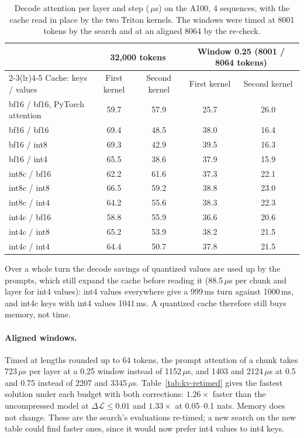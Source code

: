 \documentclass[11pt]{article}
\newcommand{\dloss}{\Delta\mathcal{L}}
\newcommand{\us}{\,$\mu$s}
\begin{document}
\begin{table}[htbp]
\centering
\small
\begin{tabular}{lcccc}
\toprule
& \multicolumn{2}{c}{32{,}000 tokens} & \multicolumn{2}{c}{Window 0.25 (8001 / 8064 tokens)} \\
\cmidrule(lr){2-3}\cmidrule(lr){4-5}
Cache: keys / values & First kernel & Second kernel & First kernel & Second kernel \\
\midrule
bf16 / bf16, PyTorch attention & 59.7 & 57.9 & 25.7 & 26.0 \\
bf16 / bf16                    & 69.4 & 48.5 & 38.0 & 16.4 \\
bf16 / int8                    & 69.3 & 42.9 & 39.5 & 16.3 \\
bf16 / int4                    & 65.5 & 38.6 & 37.9 & 15.9 \\
int8c / bf16                   & 62.2 & 61.6 & 37.3 & 22.1 \\
int8c / int8                   & 66.5 & 59.2 & 38.8 & 23.0 \\
int8c / int4                   & 64.2 & 55.6 & 38.3 & 22.3 \\
int4c / bf16                   & 58.8 & 55.9 & 36.6 & 20.6 \\
int4c / int8                   & 65.2 & 53.9 & 38.2 & 21.5 \\
int4c / int4                   & 64.4 & 50.7 & 37.8 & 21.5 \\
\bottomrule
\end{tabular}
\caption{Decode attention per layer and step (\us) on the A100, 4 sequences, with the cache read in place by
the two Triton kernels. The windows were timed at 8001 tokens by the search and at an aligned 8064 by the
re-check.}
\label{tab:kv-kernel}
\end{table}

\noindent Over a whole turn the decode savings of quantized values are used up by the prompts, which
still expand the cache before reading it (88.5\us{} per chunk and layer for int4 values): int4 values
everywhere give a 999\,ms turn against 1000\,ms, and int4c keys with int4 values 1041\,ms. A quantized
cache therefore still buys memory, not time.

\paragraph{Aligned windows.} Timed at lengths rounded up to 64 tokens, the prompt attention of a chunk
takes 723\us{} per layer at a 0.25 window instead of 1152\us, and 1403 and 2124\us{} at 0.5 and 0.75
instead of 2207 and 3345\us. Table~\ref{tab:kv-retimed} gives the fastest solution under each budget with
both corrections: $1.26\times$ faster than the uncompressed model at $\dloss\le0.01$ and $1.33\times$ at
0.05--0.1 nats. Memory does not change. These are the search's evaluations re-timed; a new search on the
new table could find faster ones, since it would now prefer int4 values to int4 keys.
\end{document}
